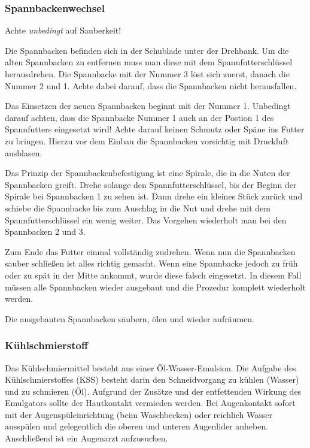 \documentclass{\basedir/fablab-document}
\begin{document}

\subsubsection{Spannbackenwechsel}
\label{zerspanung:spannbackenwechsel}
Achte \emph{unbedingt} auf Sauberkeit!
 
Die Spannbacken befinden sich in der Schublade unter der Drehbank.
Um die alten Spannbacken zu entfernen muss man diese mit dem Spannfutterschlüssel herausdrehen.
Die Spannbacke mit der Nummer 3 löst sich zuerst, danach die Nummer 2 und 1.
Achte dabei darauf, dass die Spannbacken nicht herausfallen.

Das Einsetzen der neuen Spannbacken beginnt mit der Nummer 1.
Unbedingt darauf achten, dass die Spannbacke Nummer 1 auch an der Postion 1 des Spannfutters eingesetzt wird!
Achte darauf keinen Schmutz oder Späne ins Futter zu bringen. Hierzu vor dem Einbau die Spannbacken vorsichtig mit Druckluft ausblasen.

Das Prinzip der Spannbackenbefestigung ist eine Spirale, die in die Nuten der Spannbacken greift.
Drehe solange den Spannfutterschlüssel, bis der Beginn der Spirale bei Spannbacken 1 zu sehen ist.
Dann drehe ein kleines Stück zurück und schiebe die Spannbacke bis zum Anschlag in die Nut und drehe mit dem Spannfutterschlüssel ein wenig weiter.
Das Vorgehen wiederholt man bei den Spannbacken 2 und 3.

Zum Ende das Futter einmal vollständig zudrehen.
Wenn nun die Spannbacken sauber schließen ist alles richtig gemacht.
Wenn eine Spannbacke jedoch zu früh oder zu spät in der Mitte ankommt, wurde diese falsch eingesetzt.
In diesem Fall müssen alle Spannbacken wieder ausgebaut und die Prozedur komplett wiederholt werden.

Die ausgebauten Spannbacken säubern, ölen und wieder aufräumen.

\subsubsection{Kühlschmierstoff}

Das Kühlschmiermittel besteht aus einer Öl-Wasser-Emulsion.
Die Aufgabe des Kühlschmierstoffes (KSS) besteht darin den Schneidvorgang zu kühlen (Wasser) und zu schmieren (Öl).
Aufgrund der Zusätze und der entfettenden Wirkung des Emulgators sollte der Hautkontakt vermieden werden.
Bei Augenkontakt sofort mit der Augenspüleinrichtung (beim Waschbecken) oder reichlich Wasser ausspülen und gelegentlich die oberen und unteren Augenlider anheben.
Anschließend ist ein Augenarzt aufzusuchen.
\end{document}
